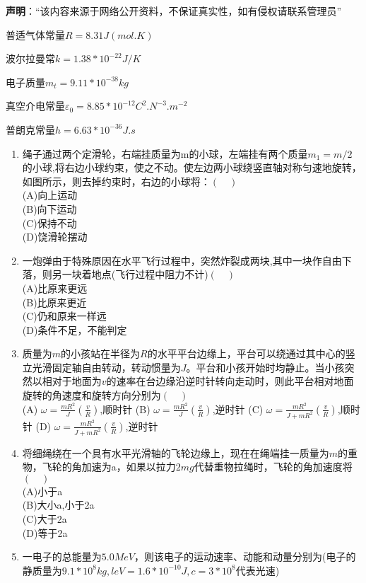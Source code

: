 
\textbf{声明}：“该内容来源于网络公开资料，不保证真实性，如有侵权请联系管理员”

普适气体常量$R=8.31J(mol.K)$

波尔拉曼常$k=1.38*10^{-22} J/K$

电子质量$m_t=9.11*10^{-38}kg$

真空介电常量$\varepsilon_0=8.85*10^{-12}C^2.N^{-3}.m^{-2}$

普朗克常量$h=6.63*10^{-36}J.s$

\begin{enumerate}
\item 绳子通过两个定滑轮，右端挂质量为m的小球，左端挂有两个质量$m_1=m/2$的小球,将右边小球约束，使之不动。使左边两小球绕竖直轴对称匀速地旋转，如图所示，则去掉约束时，右边的小球将：$(\quad)$\\
(A)向上运动\\
(B)向下运动\\
(C)保持不动\\
(D)饶滑轮摆动
\item 一炮弹由于特殊原因在水平飞行过程中，突然炸裂成两块,其中一块作自由下落，则另一块着地点(飞行过程中阻力不计)$(\quad)$\\
(A)比原来更远\\
(B)比原来更近\\
(C)仍和原来一样远\\
(D)条件不足，不能判定
\item 质量为$m$的小孩站在半径为$R$的水平平台边缘上，平台可以绕通过其中心的竖立光滑固定轴自由转动，转动惯量为$J$。平台和小孩开始时均静止。当小孩突然以相对于地面为$v$的速率在台边缘沿逆时针转向走动时，则此平台相对地面旋转的角速度和旋转方向分别为$(\quad)$\\
(A) $\omega=\frac{mR^2}{J}(\frac{v}{R})$,顺时针
(B) $\omega=\frac{mR^2}{J}(\frac{v}{R})$,逆时针
(C) $\omega=\frac{mR^2}{J+mR^2}(\frac{v}{R})$,顺时针
(D) $\omega=\frac{mR^2}{J+mR^2}(\frac{v}{R})$,逆时针
\item 将细绳绕在一个具有水平光滑轴的飞轮边缘上，现在在绳端挂一质量为$m$的重物，飞轮的角加速为a，如果以拉力$2mg$代替重物拉绳时，飞轮的角加速度将$(\quad)$\\
(A)小于a\\
(B)大小a,小于2a\\
(C)大于2a\\
(D)等于2a\\
\item 一电子的总能量为$5.0MeV$，则该电子的运动速率、动能和动量分别为(电子的静质量为$9.1*10^8kg,leV=1.6*10^{-10}J,c=3*10^8$代表光速)\\

\end{enumerate}
